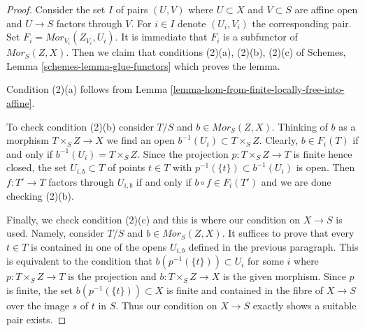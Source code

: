 \begin{proof}
Consider the set $I$ of pairs $(U, V)$ where $U \subset X$ and $V \subset S$
are affine open and $U \to S$ factors through $V$. For $i \in I$ denote
$(U_i, V_i)$ the corresponding pair. Set
$F_i = \mathit{Mor}_{V_i}(Z_{V_i}, U_i)$.
It is immediate that $F_i$ is a subfunctor of $\mathit{Mor}_S(Z, X)$.
Then we claim that conditions
(2)(a), (2)(b), (2)(c) of
Schemes, Lemma \ref{schemes-lemma-glue-functors} which proves the lemma.

\medskip\noindent
Condition (2)(a) follows from
Lemma \ref{lemma-hom-from-finite-locally-free-into-affine}.

\medskip\noindent
To check condition (2)(b) consider $T/S$ and $b \in \mathit{Mor}_S(Z, X)$.
Thinking of $b$ as a morphism $T \times_S Z \to X$ we find an open
$b^{-1}(U_i) \subset T \times_S Z$. Clearly, $b \in F_i(T)$
if and only if $b^{-1}(U_i) = T \times_S Z$. Since the projection
$p : T \times_S Z \to T$ is finite hence closed, the set
$U_{i, b} \subset T$ of points $t \in T$ with
$p^{-1}(\{t\}) \subset b^{-1}(U_i)$ is open.
Then $f : T' \to T$ factors through $U_{i, b}$ if and only
if $b \circ f \in F_i(T')$ and we are done checking (2)(b).

\medskip\noindent
Finally, we check condition (2)(c) and this is where our condition
on $X \to S$ is used. Namely, consider
$T/S$ and $b \in \mathit{Mor}_S(Z, X)$.
It suffices to prove that every $t \in T$
is contained in one of the opens $U_{i, b}$ defined
in the previous paragraph.
This is equivalent to the condition that
$b(p^{-1}(\{t\})) \subset U_i$ for some $i$
where $p : T \times_S Z \to T$ is the projection and
$b : T \times_S Z \to X$ is the given morphism.
Since $p$ is finite, the set $b(p^{-1}(\{t\})) \subset X$
is finite and contained in the fibre of $X \to S$ over
the image $s$ of $t$ in $S$.
Thus our condition on $X \to S$ exactly shows a
suitable pair exists.
\end{proof}












